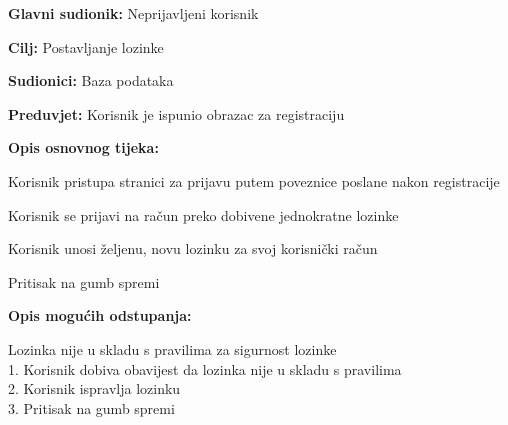 					\noindent {}
					\begin{packed_item}
						\item \textbf{Glavni sudionik:} Neprijavljeni korisnik
						\item \textbf{Cilj:} Postavljanje lozinke
						\item \textbf{Sudionici:} Baza podataka
						\item \textbf{Preduvjet:} Korisnik je ispunio obrazac za registraciju
						\item \textbf{Opis osnovnog tijeka:}
						\begin{packed_enum}
							\item Korisnik pristupa stranici za prijavu putem poveznice poslane nakon registracije
							\item Korisnik se prijavi na račun preko dobivene jednokratne lozinke
							\item Korisnik unosi željenu, novu lozinku za svoj korisnički račun
							\item Pritisak na gumb spremi
						\end{packed_enum}
						\item \textbf{Opis mogućih odstupanja:}
						\begin{packed_item}
							\item[2.a] Lozinka nije u skladu s pravilima za sigurnost lozinke 
							\\1. Korisnik dobiva obavijest da lozinka nije u skladu s pravilima
							\\2. Korisnik ispravlja lozinku
							\\3. Pritisak na gumb spremi
						\end{packed_item}
					\end{packed_item}


